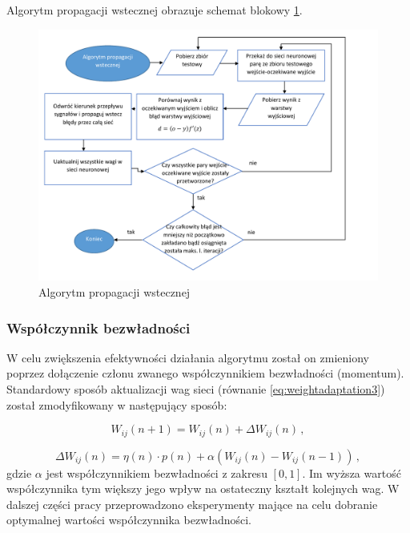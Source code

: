 \documentclass[twoside]{iisthesis}
\begin{document}
	 Algorytm propagacji wstecznej obrazuje schemat blokowy \ref{fig:propagacjawsteczna}.
	 
	 \begin{figure}[!ht] 
			 	\centering
			 	\includegraphics[width=1\textwidth]{propagacjawsteczna}
			 	\caption{Algorytm propagacji wstecznej}
			 	\label{fig:propagacjawsteczna}
	 \end{figure}
	 
	 \subsubsection{Współczynnik bezwładności}
	 \label{sss:metoda_momentum}
	 
	 W celu zwiększenia efektywności działania algorytmu został on zmieniony poprzez dołączenie członu zwanego współczynnikiem bezwładności (momentum). Standardowy sposób aktualizacji wag sieci (równanie \ref{eq:weightadaptation3}) został zmodyfikowany w następujący sposób:
	 
	 \begin{equation}
	 \label{eq:zasadamomentum1}
	 W_{ij}(n+1) = W_{ij}(n) + \Delta W_{ij}(n) 
	 \,,
	 \end{equation}
	 
	 \begin{equation}
	 \label{eq:zasadamomentum2}
	 \Delta W_{ij}(n) = \eta(n) \cdot p(n) + \alpha(W_{ij}(n)-W_{ij}(n-1)) 
	 \,,
	 \end{equation}		 
	 gdzie $\alpha$ jest współczynnikiem bezwładności z zakresu $[0,1]$. Im wyższa wartość współczynnika tym większy jego wpływ na ostateczny kształt kolejnych wag. W dalszej części pracy przeprowadzono eksperymenty mające na celu dobranie optymalnej wartości współczynnika bezwładności.
	 
\end{document}
